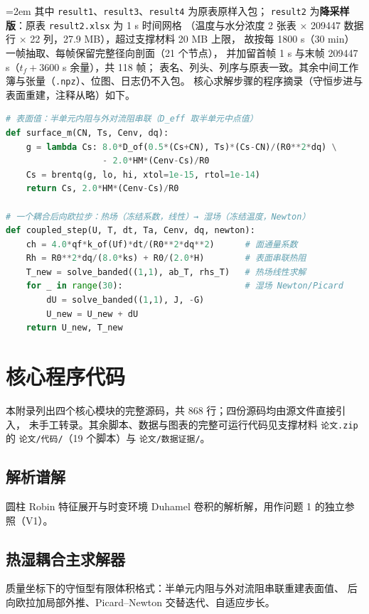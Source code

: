 \documentclass[12pt,a4paper]{ctexart}
\numberwithin{equation}{section}
\begin{document}
{\emergencystretch=2em
其中 \texttt{result1}、\texttt{result3}、\texttt{result4} 为原表原样入包；
\texttt{result2} 为\textbf{降采样版}：原表 \texttt{result2.xlsx} 为 1 s 时间网格
（温度与水分浓度 2 张表 × 209447 数据行 × 22 列，27.9 MB），超过支撑材料 20 MB 上限，
故按每 1800 s（30 min）一帧抽取、每帧保留完整径向剖面（21 个节点），
并加留首帧 1 s 与末帧 209447 s（$t_f+3600$ s 余量），共 118 帧；
表名、列头、列序与原表一致。其余中间工作簿与张量（\texttt{.npz}）、位图、日志仍不入包。}
\clearpage
核心求解步骤的程序摘录（守恒步进与表面重建，注释从略）如下。

\begin{lstlisting}[language=Python,caption={守恒耦合步进核心（solver 摘录）}]
# 表面值：半单元内阻与外对流阻串联（D_eff 取半单元中点值）
def surface_m(CN, Ts, Cenv, dq):
    g = lambda Cs: 8.0*D_of(0.5*(Cs+CN), Ts)*(Cs-CN)/(R0**2*dq) \
                   - 2.0*HM*(Cenv-Cs)/R0
    Cs = brentq(g, lo, hi, xtol=1e-15, rtol=1e-14)
    return Cs, 2.0*HM*(Cenv-Cs)/R0

# 一个耦合后向欧拉步：热场（冻结系数，线性）→ 湿场（冻结温度，Newton）
def coupled_step(U, T, dt, Ta, Cenv, dq, newton):
    ch = 4.0*qf*k_of(Uf)*dt/(R0**2*dq**2)      # 面通量系数
    Rh = R0**2*dq/(8.0*ks) + R0/(2.0*H)        # 表面串联热阻
    T_new = solve_banded((1,1), ab_T, rhs_T)   # 热场线性求解
    for _ in range(30):                        # 湿场 Newton/Picard
        dU = solve_banded((1,1), J, -G)
        U_new = U_new + dU
    return U_new, T_new
\end{lstlisting}

\section{核心程序代码}
本附录列出四个核心模块的完整源码，共 868 行；四份源码均由源文件直接引入，
未手工转录。其余脚本、数据与图表的完整可运行代码见支撑材料 \texttt{论文.zip} 的
\texttt{论文/代码/}（19 个脚本）与 \texttt{论文/数据证据/}。

\subsection{解析谱解}
圆柱 Robin 特征展开与时变环境 Duhamel 卷积的解析解，用作问题 1 的独立参照（V1）。


\subsection{热湿耦合主求解器}
质量坐标下的守恒型有限体积格式：半单元内阻与外对流阻串联重建表面值、
后向欧拉加局部外推、Picard--Newton 交替迭代、自适应步长。

\end{document}
